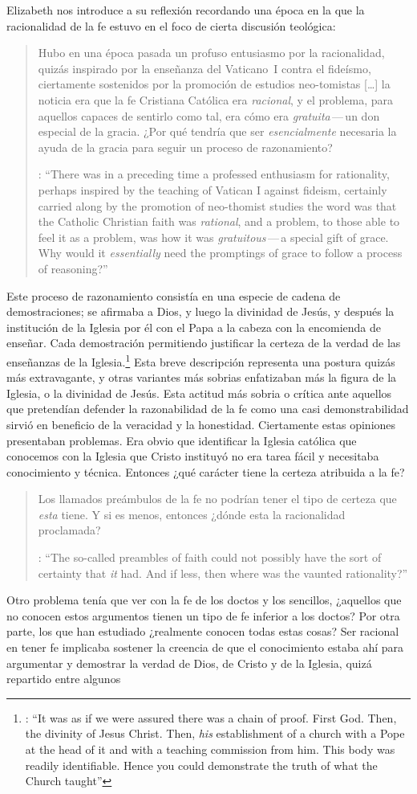 Elizabeth nos introduce a su reflexión recordando una época en la que la racionalidad de la fe estuvo en el foco de cierta discusión teológica: \blockquote[{\cite[113]{anscombe1981erp:faith}}: \enquote{There was in a preceding time a professed enthusiasm for rationality, perhaps inspired by the teaching of Vatican I against fideism, certainly carried along by the promotion of neo-thomist studies \textelp{} the word was that the Catholic Christian faith was \emph{rational}, and a problem, to those able to feel it as a problem, was how it was \emph{gratuitous}\,---\,a special gift of grace. Why would it \emph{essentially} need the promptings of grace to follow a process of reasoning?}]{Hubo en una época pasada un profuso entusiasmo por la racionalidad, quizás inspirado por la enseñanza del Vaticano~I contra el fideísmo, ciertamente sostenidos por la promoción de estudios neo-tomistas [\ldots] la noticia era que la fe Cristiana Católica era \emph{racional}, y el problema, para aquellos capaces de sentirlo como tal, era cómo era \emph{gratuita}\,---\,un don especial de la gracia. ¿Por qué tendría que ser \emph{esencialmente} necesaria la ayuda de la gracia para seguir un proceso de razonamiento?}. Este proceso de razonamiento consistía en una especie de cadena de demostraciones; se afirmaba a Dios, y luego la divinidad de Jesús, y después la institución de la Iglesia por él con el Papa a la cabeza con la encomienda de enseñar. Cada demostración permitiendo justificar la certeza de la verdad de las enseñanzas de la Iglesia.\footnote{\cite[Cf.~][12]{anscombe1981erp:faith}: \enquote{It was as if we were assured there was a chain of proof. First God. Then, the divinity of Jesus Christ. Then, \emph{his} establishment of a church with a Pope at the head of it and with a teaching commission from him. This body was readily identifiable. Hence you could demonstrate the truth of what the Church taught}} Esta breve descripción representa una postura quizás más extravagante, y otras variantes más sobrias enfatizaban más la figura de la Iglesia, o la divinidad de Jesús. Esta actitud más sobria o crítica ante aquellos que pretendían defender la razonabilidad de la fe como una casi demonstrabilidad sirvió en beneficio de la veracidad y la honestidad. Ciertamente estas opiniones presentaban problemas. Era obvio que identificar la Iglesia católica que conocemos con la Iglesia que Cristo instituyó no era tarea fácil y necesitaba conocimiento y técnica. Entonces ¿qué carácter tiene la certeza atribuida a la fe? \blockquote[{\cite[114]{anscombe1981erp:faith}}: \enquote{The so-called preambles of faith could not possibly have the sort of certainty that \emph{it} had. And if less, then where was the vaunted rationality?}]{Los llamados preámbulos de la fe no podrían tener el tipo de certeza que \emph{esta} tiene. Y si es menos, entonces ¿dónde esta la racionalidad proclamada?}. Otro problema tenía que ver con la fe de los doctos y los sencillos, ¿aquellos que no conocen estos argumentos tienen un tipo de fe inferior a los doctos? Por otra parte, los que han estudiado ¿realmente conocen todas estas cosas? Ser racional en tener fe implicaba sostener la creencia de que el conocimiento estaba ahí para argumentar y demostrar la verdad de Dios, de Cristo y de la Iglesia, quizá repartido entre algunos 